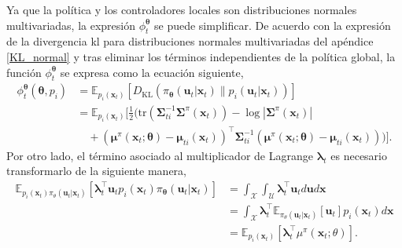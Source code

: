 Ya que la política y los controladores locales son distribuciones normales multivariadas, la expresión $\phi_t^{\bm\theta}$ se puede simplificar. De acuerdo con la expresión de la divergencia \acrshort{kl} para distribuciones normales multivariadas del apéndice \ref{KL_normal} y tras eliminar los términos independientes de la política global, la función $\phi_{t}^{\bm\theta}$ se expresa como la ecuación siguiente, 
 \begin{equation}
\begin{aligned}
    \phi_t^{\bm{\theta}}(\bm{\theta}, p_i) &= 
    \mathbb{E}_{p_i(\mathbf{x}_t)} \left[ D_{\text{KL}} \left( \pi_{\bm{\theta}}(\mathbf{u}_t|\mathbf{x}_t) \| p_i(\mathbf{u}_t|\mathbf{x}_t) \right) \right] \\
    &= \mathbb{E}_{p_i(\mathbf{x}_t)} \Bigg[ \frac{1}{2} \bigg( \text{tr} \left( \bm{\Sigma}_{ti}^{-1} \bm{\Sigma}^{\pi}(\mathbf{x}_t) \right) - \log \left| \bm{\Sigma}^{\pi}(\mathbf{x}_t) \right| \\
    &\quad + \left( \bm{\mu}^{\pi}(\mathbf{x}_t; \bm{\theta}) - \bm{\mu}_{ti}(\mathbf{x}_t) \right)^{\top} \bm{\Sigma}_{ti}^{-1} \left( \bm{\mu}^{\pi}(\mathbf{x}_t; \bm{\theta}) - \bm{\mu}_{ti}(\mathbf{x}_t) \right) \bigg) \Bigg].
\end{aligned}
\end{equation}
Por otro lado, el término asociado al multiplicador de Lagrange $\bm\lambda_t$ es necesario transformarlo de la siguiente manera, 
\begin{equation}
    \begin{aligned}
    \mathbb{E}_{p_i(\mathbf{x}_t)\pi_{\theta}(\mathbf{u}_t|\mathbf{x}_t)}\left[\bm\lambda_t^{\top}\mathbf{u}_tp_i(\mathbf{x}_t)\pi_{\bm\theta}(\mathbf{u}_t|\mathbf{x}_t)\right] & = \int_{\mathcal{X}}\int_{\mathcal{U}}\bm\lambda_t^{\top}\mathbf{u}_t d\mathbf{u}d\mathbf{x} \\
    &= \int_{\mathcal{X}} \bm\lambda_t^{\top}\mathbb{E}_{\pi_{\theta}(\mathbf{u}_t|\mathbf{x}_t)}\left[\mathbf{u}_t\right] p_i(\mathbf{x}_t)d\mathbf{x}\\
    &= \mathbb{E}_{p_i(\mathbf{x}_t)}\left[\bm\lambda_t^{\top}\mu^{\pi}(\mathbf{x}_t; \theta)\right].
\end{aligned}
\end{equation}

